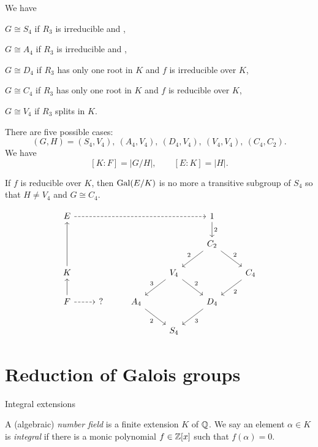 \documentclass{../../large}
\begin{document}
\begin{thm}
We have
\begin{parts}
\item $G\cong S_4$ if $R_3$ is irreducible and ,
\item $G\cong A_4$ if $R_3$ is irreducible and ,
\item $G\cong D_4$ if $R_3$ has only one root in $K$ and $f$ is irreducible over $K$,
\item $G\cong C_4$ if $R_3$ has only one root in $K$ and $f$ is reducible over $K$,
\item $G\cong V_4$ if $R_3$ splits in $K$.
\end{parts}
\end{thm}
\begin{pf}
There are five possible cases:
\[(G,H)=(S_4,V_4),\ (A_4,V_4),\ (D_4,V_4),\ (V_4,V_4),\ (C_4,C_2).\]
We have
\[[K:F]=|G/H|,\qquad[E:K]=|H|.\]

If $f$ is reducible over $K$, then $\operatorname{Gal}(E/K)$ is no more a transitive subgroup of $S_4$ so that $H\ne V_4$ and $G\cong C_4$.
\end{pf}
\[\begin{tikzcd}
E \ar[rrrr,dashed] &&&& 1 \dar{2} &\\
&&&& C_2 \dlar[swap]{2}\drar{2}&\\
K\ar[uu] &&& V_4 \dlar[swap]{3}\drar{2} && C_4 \dlar{2}\\
F \uar\rar[dashed]& ? & A_4 \drar[swap]{2} && D_4 \dlar{3} &\\
&&&S_4&&
\end{tikzcd}\]





\section{Reduction of Galois groups}

{Integral extensions}

\begin{prb}
A (algebraic) \emph{number field} is a finite extension $K$ of $\mathbb{Q}$.
We say an element $\alpha\in K$ is \emph{integral} if there is a monic polynomial $f\in\mathbb{Z}[x]$ such that $f(\alpha)=0$.
\end{prb}
\end{document}
